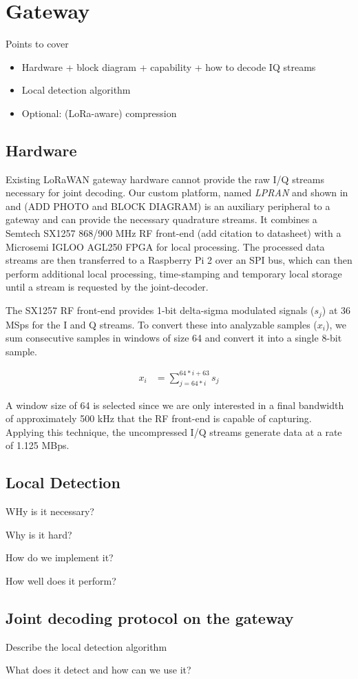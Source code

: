 \section{Gateway}
\label{sec:gateway}

{\color{blue} Points to cover
\begin{itemize}
    \item Hardware + block diagram + capability + how to decode IQ streams
    \item Local detection algorithm
    \item Optional: (LoRa-aware) compression
\end{itemize}

}

\subsection{Hardware}
\label{sec:hardware}

Existing LoRaWAN gateway hardware cannot provide the raw I/Q streams necessary
for joint decoding. Our custom platform, named \textit{LPRAN} and shown in
 and  {\color{blue} (ADD PHOTO and
BLOCK DIAGRAM)} is an auxiliary peripheral to a gateway and can provide the
necessary quadrature streams. It combines a Semtech SX1257 868/900 MHz RF
front-end {\color{blue} (add citation to datasheet)} with a Microsemi IGLOO
AGL250 FPGA for local processing. The processed data streams are then
transferred to a Raspberry Pi 2 over an SPI bus, which can then perform
additional local processing, time-stamping and temporary local storage until a
stream is requested by the joint-decoder.

The SX1257 RF front-end provides 1-bit delta-sigma modulated signals ($s_j$)
at 36 MSps for the I and Q streams. To convert these into analyzable samples
($x_i$), we sum consecutive samples in windows of size 64 and convert it into
a single 8-bit sample.

\begin{align*}
x_i &= \sum_{j=64*i}^{64*i + 63} s_j
\end{align*}

A window size of 64 is selected since we are only interested in a final
bandwidth of approximately 500 kHz that the RF front-end is capable of
capturing. Applying this technique, the uncompressed I/Q streams generate data
at a rate of 1.125 MBps.

\subsection{Local Detection}
\label{sec:local-detection}

WHy is it necessary?

Why is it hard?

How do we implement it?

How well does it perform?

\subsection{Joint decoding protocol on the gateway}

{\color{blue}

Describe the local detection algorithm

What does it detect and how can we use it?

}